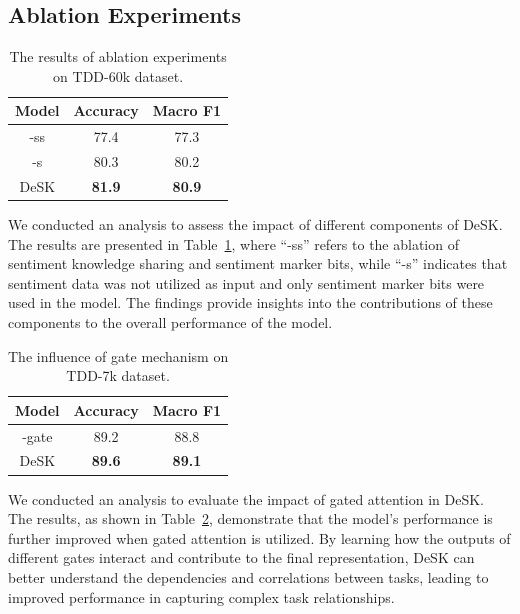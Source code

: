 \documentclass[runningheads]{llncs}
\begin{document}
\subsection{Ablation Experiments}
\begin{table}[ht]
    \caption{The results of ablation experiments on TDD-60k dataset.}
    \setlength{\tabcolsep}{13.5mm}
    \label{tab:4}
    \begin{tabular}{ccc}
    \toprule
        Model & Accuracy & Macro F1 \\ 
    \midrule
        -ss & 77.4 & 77.3 \\[10pt]
        -s & 80.3 & 80.2 \\[10pt]
        DeSK & \textbf{81.9} & \textbf{80.9} \\[10pt]
    \bottomrule
    \end{tabular}\par\smallskip
\end{table}
We conducted an analysis to assess the impact of different components of DeSK. The results are presented in Table~\ref{tab:4}, where ``-ss'' refers to the ablation of sentiment knowledge sharing and sentiment marker bits, while ``-s'' indicates that sentiment data was not utilized as input and only sentiment marker bits were used in the model. The findings provide insights into the contributions of these components to the overall performance of the model.

\begin{table}[ht]
    \caption{The influence of gate mechanism on TDD-7k dataset.}
    \setlength{\tabcolsep}{13.5mm}
    \label{tab:5}
    \begin{tabular}{ccc}
    \toprule
        Model & Accuracy & Macro F1 \\ 
    \midrule
        -gate & 89.2 & 88.8 \\[10pt]
        DeSK & \textbf{89.6} & \textbf{89.1} \\[10pt]
    \bottomrule
    \end{tabular}\par\smallskip
\end{table}

We conducted an analysis to evaluate the impact of gated attention in DeSK. The results, as shown in Table~\ref{tab:5}, demonstrate that the model's performance is further improved when gated attention is utilized. By learning how the outputs of different gates interact and contribute to the final representation, DeSK can better understand the dependencies and correlations between tasks, leading to improved performance in capturing complex task relationships.
\end{document}
